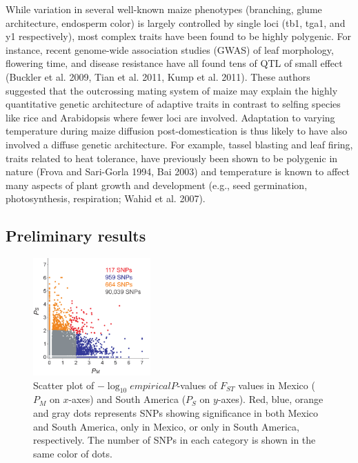 While variation in several well-known maize phenotypes (branching, glume architecture, endosperm color) is largely controlled by single loci (tb1, tga1, and y1 respectively), most complex traits have been found to be highly polygenic.  For instance, recent genome-wide association studies (GWAS) of leaf morphology, flowering time, and disease resistance have all found tens of QTL of small effect (Buckler et al. 2009, Tian et al. 2011, Kump et al. 2011).  These authors suggested that the outcrossing mating system of maize may explain the highly quantitative genetic architecture of adaptive traits in contrast to selfing species like rice and Arabidopsis where fewer loci are involved.  Adaptation to varying temperature during maize diffusion post-domestication is thus likely to have also involved a diffuse genetic architecture.  For example, tassel blasting and leaf firing, traits related to heat tolerance, have previously been shown to be polygenic in nature (Frova and Sari-Gorla 1994, Bai 2003) and temperature is known to affect many aspects of plant growth and development (e.g., seed germination, photosynthesis, respiration; Wahid et al. 2007).  

\subsection*{Preliminary results}

\begin{figure}
   \includegraphics[width=0.4\textwidth]{fst.pdf}
   \caption{Scatter plot of $-\log_10 empirical P$-values of $F_{ST}$ values in Mexico ($P_M$ on $x$-axes) and South America ($P_S$ on $y$-axes).   Red, blue, orange and gray dots represents SNPs showing significance in both Mexico and South America, only in Mexico, or only in South America, respectively.  The number of SNPs in each category is shown in the same color of dots.} 
    \label{PvDist}
\end{figure}


\renewcommand{\thesection}{Aim \arabic{section}}
